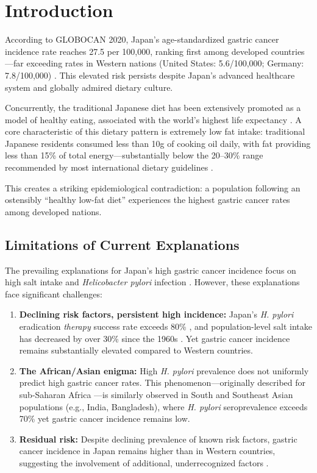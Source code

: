\documentclass[review]{elsarticle}
\begin{document}
\linenumbers

\section{Introduction}

According to GLOBOCAN 2020, Japan's age-standardized gastric cancer incidence rate reaches 27.5 per 100,000, ranking first among developed countries---far exceeding rates in Western nations (United States: 5.6/100,000; Germany: 7.8/100,000) \cite{sung2021}. This elevated risk persists despite Japan's advanced healthcare system and globally admired dietary culture.

Concurrently, the traditional Japanese diet has been extensively promoted as a model of healthy eating, associated with the world's highest life expectancy \cite{willcox2009}. A core characteristic of this dietary pattern is extremely low fat intake: traditional Japanese residents consumed less than 10g of cooking oil daily, with fat providing less than 15\% of total energy---substantially below the 20--30\% range recommended by most international dietary guidelines \cite{mhlw2020,chinese2022}.

This creates a striking epidemiological contradiction: a population following an ostensibly ``healthy low-fat diet'' experiences the highest gastric cancer rates among developed nations.

\subsection{Limitations of Current Explanations}

The prevailing explanations for Japan's high gastric cancer incidence focus on high salt intake \cite{delia2012} and \textit{Helicobacter pylori} infection \cite{uemura2001}. However, these explanations face significant challenges:

\begin{enumerate}
    \item \textbf{Declining risk factors, persistent high incidence:} Japan's \textit{H. pylori} eradication \textit{therapy} success rate exceeds 80\% \cite{kamada2015}, and population-level salt intake has decreased by over 30\% since the 1960s \cite{powles2013}. Yet gastric cancer incidence remains substantially elevated compared to Western countries.
    
    \item \textbf{The African/Asian enigma:} High \textit{H. pylori} prevalence does not uniformly predict high gastric cancer rates. This phenomenon---originally described for sub-Saharan Africa \cite{holcombe1992}---is similarly observed in South and Southeast Asian populations (e.g., India, Bangladesh), where \textit{H. pylori} seroprevalence exceeds 70\% yet gastric cancer incidence remains low.
    
    \item \textbf{Residual risk:} Despite declining prevalence of known risk factors, gastric cancer incidence in Japan remains higher than in Western countries, suggesting the involvement of additional, underrecognized factors \cite{inoue2005}.
\end{enumerate}
\end{document}
